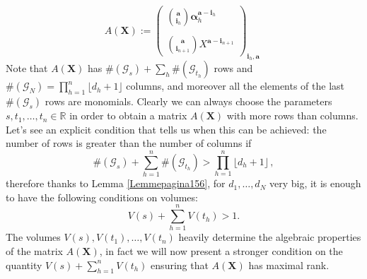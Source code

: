 \documentclass[10 pt,a4paper]{article}
\theoremstyle{plain}
\theoremstyle{definition}
\theoremstyle{named}
\newcommand{\sC}{\mathcal{C}}
\newcommand{\sG}{\mathcal{G}}
\begin{document}
\begin{appendices}
\begin{equation}\label{interpolation matrix}
A(\bm{X}):=\begin{pmatrix}
{{\bm{a}}\choose {\bm{i}}_h }\bm\alpha_h^{{\bm{a}} -{{\bm{i}}_{h}}}\\\\
{{\bm{a}}\choose {\bm{i}}_{n+1} }X^{{\bm{a}}-{\bm{i}}_{n+1}}
\end{pmatrix}_{\bm i_h,\bm a}\,\, 
\end{equation}
Note that $A(\bm X)$ has $\#(\mathcal G_s)+\sum_h \#(\mathcal G_{t_h})$ rows and $\#(\mathcal G_N)=\prod^n_{h=1}\lfloor d_h+1\rfloor$ columns, and moreover all the elements of the last $\#(\sG_{s})$ rows are monomials. Clearly we can always choose the parameters $s, t_1,\dots, t_n\in\mathbb R$ in order to obtain a matrix $A(\bm{X})$ with more rows than columns. Let's see an explicit condition that tells us when this can be achieved: the number of rows is greater than the number of columns if 
$$\#(\sG_{s})+\sum^n_{h=1}\#(\sG_{t_h})> \prod^n_{h=1}\lfloor d_h+1\rfloor
\,,$$
therefore thanks to Lemma \ref{Lemmepagina156}, for $d_1,\ldots, d_N$ very big, it is enough to have the following conditions on volumes: 
\begin{equation}\label{volume}
V(s)+\sum_{h=1}^{n}V(t_h)>1.
\end{equation}
The volumes $V(s),V(t_1),\ldots, V(t_n)$  heavily determine the algebraic properties of the matrix $A(\bm X)$, in fact we will now present a stronger condition on the quantity $V(s)+\sum_{h=1}^{n}V(t_h)$ ensuring that $A(\bm X)$ has maximal rank.


\end{appendices}
\end{document}
